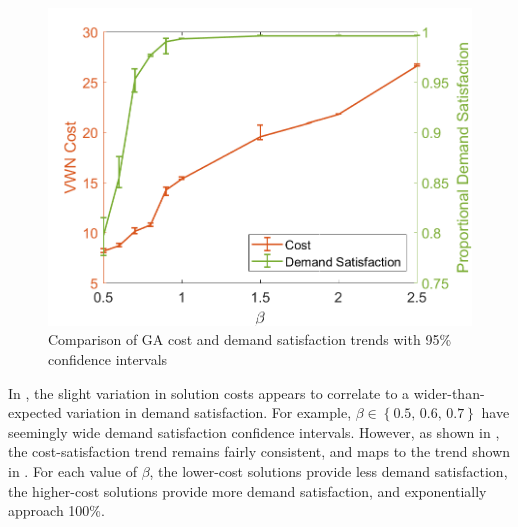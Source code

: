\documentclass[12pt,dvipsnames]{report}
\begin{document}
\begin{figure}[htp]
	\centering
	\includegraphics[height=0.4\textheight]{Figures/CaseII_GAComparisonCostSat}
	\caption[Comparison of Case II GA approach cost and demand satisfaction]{Comparison of GA cost and demand satisfaction trends with 95\% confidence intervals}
	\label{fig:CaseII_GAComparisonCostSat}
\end{figure}
	
In , the slight variation in solution costs appears to correlate to a wider-than-expected variation in demand satisfaction.  For example,  $\beta \in \left\{ 0.5,\, 0.6,\, 0.7 \right\}$ have seemingly wide demand satisfaction confidence intervals.  However, as shown in , the cost-satisfaction trend remains fairly consistent, and maps to the trend shown in .  For each value of $\beta$, the lower-cost solutions provide less demand satisfaction, the higher-cost solutions provide more demand satisfaction, and exponentially approach 100\%.
\end{document}
